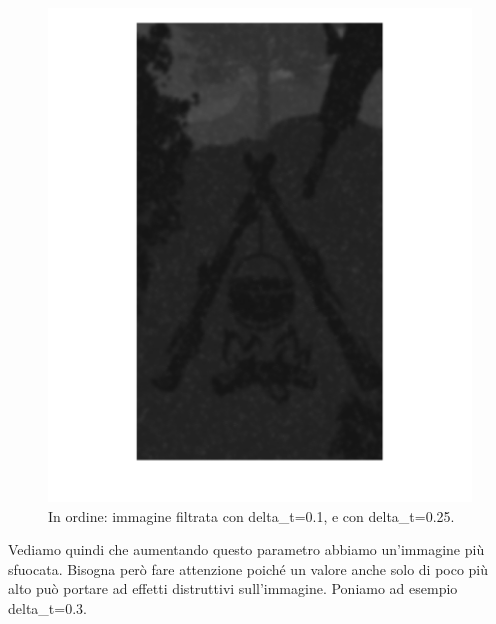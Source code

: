 \begin{figure}[htb]
\includegraphics[scale=0.15]{Pictures/Esempi di utilizzo/Esempio 3/Dettaglio_SfondoForesta_filtrata_deltat0_25.png}
\caption{In ordine: immagine filtrata con delta\_t=0.1, e con delta\_t=0.25.}\label{fig:figura}
\end{figure} 

Vediamo quindi che aumentando questo parametro abbiamo un'immagine più sfuocata. Bisogna però fare attenzione poiché un valore anche solo di poco più alto può portare ad effetti distruttivi sull'immagine. Poniamo ad esempio delta\_t=0.3.

